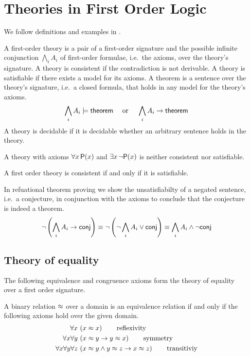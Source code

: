 \section{Theories in First Order Logic}\label{sec:decidable:fol:theories}

We follow definitions and examples in \cite{AM2015L}.

\begin{definition}[Theory]
	A {\myem first-order theory} is a pair of a first-order signature 
	and the possible infinite conjunction $\bigwedge_i A_i$ of first-order formulae, 
	i.e.~the axioms, over the theory's signature. 
	A theory is {\myem consistent} if the contradiction is not derivable.
	A theory is satisfiable if there exists a model for its axioms.
%	
	A {\myem theorem} is a sentence over the theory's signature, 
	i.e.~a closed formula, that holds in any model for the theory's axioms.
	\[
		\bigwedge_i A_i \models \mathsf{theorem} 
		\quad\text{ or }\quad
		\bigwedge_i A_i \rightarrow \mathsf{theorem} 
	\]
	A theory is decidable if it is decidable whether an arbitrary sentence holds in the theory.
\end{definition}

\begin{example}
A theory with axioms $\forall x\,{\mathsf P}(x)$ and $\exists x\,\lnot{\mathsf P}(x)$ is neither consistent nor satisfiable.
\end{example}

\begin{lemma}
	A first order theory is consistent if and only if it is satisfiable.
\end{lemma}
%
\begin{remark} 
In refuational theorem proving
we show the unsatisfiabilty 
of a negated sentence, 
i.e.~a {\myem conjecture},
in conjunction with the axioms
to conclude that the conjecture is indeed a theorem.
\[
	\lnot\left(\bigwedge_i A_i \rightarrow \mathsf{conj}\right) \equiv
	\lnot\left(\lnot\bigwedge_i A_i \lor \mathsf{conj}\right) \equiv
	\bigwedge_i A_i \land \lnot \mathsf{conj}
\]
\end{remark}

\subsection{Theory of equality}

The following equivalence and congruence axioms form the theory of equality over a first order signature.

\begin{definition}
	[Equivalence] A binary relation $\approx$ over a domain 
	is an equivalence relation if and only if the following axioms hold over the given domain. 
	\label{def:equivalence:axioms}
\begin{align*}
\forall x\, 
&\left(x \approx x\right) 
\tag*{reflexivity}
\\
\forall x \forall y\, 
&\left(x \approx y \rightarrow y \approx x \right)
\tag*{symmetry} 
\\
\forall x \forall y \forall z\,
&\left(x \approx y \land y\approx z \rightarrow x\approx z\right) 
\tag*{transitiviy}
\end{align*}
\end{definition}

